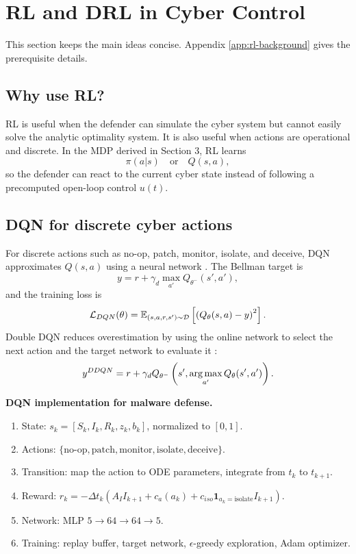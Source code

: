 \documentclass[11pt,a4paper]{article}
\begin{document}
\section{RL and DRL in Cyber Control}
This section keeps the main ideas concise. Appendix \ref{app:rl-background} gives the prerequisite details.

\subsection{Why use RL?}
RL is useful when the defender can simulate the cyber system but cannot easily solve the analytic optimality system. It is also useful when actions are operational and discrete. In the MDP derived in Section 3, RL learns
\begin{equation}
\pi(a|s)\quad\text{or}\quad Q(s,a),
\end{equation}
so the defender can react to the current cyber state instead of following a precomputed open-loop control $u(t)$.

\subsection{DQN for discrete cyber actions}
For discrete actions such as no-op, patch, monitor, isolate, and deceive, DQN approximates $Q(s,a)$ using a neural network \cite{mnih2015}. The Bellman target is
\begin{equation}
y=r+\gamma_d\max_{a'}Q_{\theta^-}(s',a'),
\end{equation}
and the training loss is
\begin{equation}
\mathcal{L}_{DQN}(\theta)=\mathbb{E}_{(s,a,r,s')\sim\mathcal{D}}\left[\left(Q_\theta(s,a)-y\right)^2\right].
\end{equation}
Double DQN reduces overestimation by using the online network to select the next action and the target network to evaluate it \cite{vanhasselt2016ddqn}:
\begin{equation}
y^{DDQN}=r+\gamma_d Q_{\theta^-}\left(s',\operatorname*{arg\,max}_{a'}Q_\theta(s',a')\right).
\end{equation}

\begin{methodbox}
\textbf{DQN implementation for malware defense.}
\begin{enumerate}
\item State: $s_k=[S_k,I_k,R_k,z_k,b_k]$, normalized to $[0,1]$.
\item Actions: $\{\text{no-op},\text{patch},\text{monitor},\text{isolate},\text{deceive}\}$.
\item Transition: map the action to ODE parameters, integrate from $t_k$ to $t_{k+1}$.
\item Reward: $r_k=-\Delta t_k(A_II_{k+1}+c_a(a_k)+c_{iso}\mathbf{1}_{a_k=\text{isolate}}I_{k+1})$.
\item Network: MLP $5\to64\to64\to5$.
\item Training: replay buffer, target network, $\epsilon$-greedy exploration, Adam optimizer.
\end{enumerate}
\end{methodbox}
\end{document}
